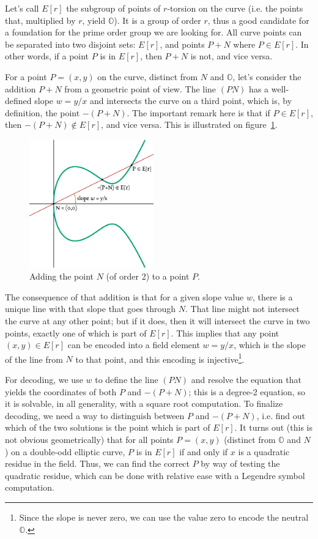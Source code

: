 \documentclass{llncs}
\newcommand{\neutral}{\mathbb{O}}
\begin{document}
Let's call $E[r]$ the subgroup of points of $r$-torsion on the curve
(i.e. the points that, multiplied by $r$, yield $\neutral$). It is a
group of order $r$, thus a good candidate for a foundation for the prime
order group we are looking for. All curve points can be separated into
two disjoint sets: $E[r]$, and points $P+N$ where $P\in E[r]$. In other
words, if a point $P$ is in $E[r]$, then $P+N$ is not, and vice versa.

For a point $P = (x,y)$ on the curve, distinct from $N$ and $\neutral$,
let's consider the addition $P+N$ from a geometric point of view. The
line $(PN)$ has a well-defined slope $w = y/x$ and intersects the curve
on a third point, which is, by definition, the point $-(P+N)$. The
important remark here is that if $P \in E[r]$, then $-(P+N) \notin
E[r]$, and vice versa. This is illustrated on
figure~\ref{fig:curve3-addN}.

\begin{figure}[H]
\begin{center}
    \includegraphics[width=0.48\textwidth]{curve3-addN.pdf}
\end{center}
\caption{\label{fig:curve3-addN}Adding the point $N$ (of order 2) to
a point $P$.}
\end{figure}

The consequence of that addition is that for a given slope value $w$,
there is a unique line with that slope that goes through $N$. That line
might not intersect the curve at any other point; but if it does, then
it will intersect the curve in two points, exactly one of which is part
of $E[r]$. This implies that any point $(x, y) \in E[r]$ can be encoded
into a field element $w = y/x$, which is the slope of the line from $N$
to that point, and this encoding is injective\footnote{Since the slope
is never zero, we can use the value zero to encode the neutral
$\neutral$.}.

For decoding, we use $w$ to define the line $(PN)$ and resolve the
equation that yields the coordinates of both $P$ and $-(P+N)$; this is a
degree-2 equation, so it is solvable, in all generality, with a square
root computation. To finalize decoding, we need a way to distinguish
between $P$ and $-(P+N)$, i.e. find out which of the two solutions is
the point which is part of $E[r]$. It turns out (this is not obvious
geometrically) that for all points $P = (x, y)$ (distinct from
$\neutral$ and $N$) on a double-odd elliptic curve, $P$ is in $E[r]$ if
and only if $x$ is a quadratic residue in the field. Thus, we can find
the correct $P$ by way of testing the quadratic residue, which can be
done with relative ease with a Legendre symbol computation.
\end{document}
